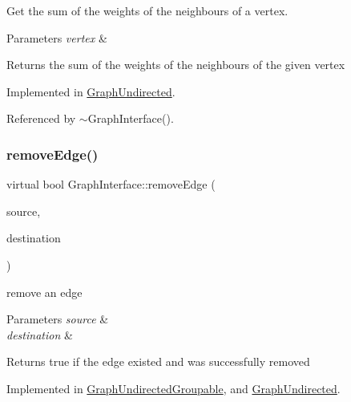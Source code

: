 Get the sum of the weights of the neighbours of a vertex. 


\begin{DoxyParams}{Parameters}
{\em vertex} & \\
\hline
\end{DoxyParams}
\begin{DoxyReturn}{Returns}
the sum of the weights of the neighbours of the given vertex 
\end{DoxyReturn}


Implemented in \hyperlink{classGraphUndirected_aa6c4a4b19efb152de6cdc21d67ac5eed}{Graph\+Undirected}.



Referenced by $\sim$\+Graph\+Interface().

\mbox{\label{classGraphInterface_a1297fd6d7c9698197b5f570f2a9f3701}} 
\subsubsection{\texorpdfstring{remove\+Edge()}{removeEdge()}\hspace{0.1cm}{\footnotesize\ttfamily [1/2]}}
{\footnotesize\ttfamily virtual bool Graph\+Interface\+::remove\+Edge (\begin{DoxyParamCaption}\item[{const \hyperlink{edge_8h_a5fbd20c46956d479cb10afc9855223f6}{type\+Vertex} \&}]{source,  }\item[{const \hyperlink{edge_8h_a5fbd20c46956d479cb10afc9855223f6}{type\+Vertex} \&}]{destination }\end{DoxyParamCaption})\hspace{0.3cm}{\ttfamily [pure virtual]}}

remove an edge


\begin{DoxyParams}{Parameters}
{\em source} & \\
\hline
{\em destination} & \\
\hline
\end{DoxyParams}
\begin{DoxyReturn}{Returns}
true if the edge existed and was successfully removed 
\end{DoxyReturn}


Implemented in \hyperlink{classGraphUndirectedGroupable_ad1a488cc292d7e63d289f598aeaaacd6}{Graph\+Undirected\+Groupable}, and \hyperlink{classGraphUndirected_af4a40541132a66c9b688a20958057751}{Graph\+Undirected}.



